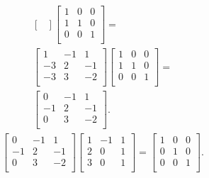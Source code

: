 \documentclass[12pt]{article}
\begin{document}
\begin{enumerate}
\begin{align*}
\begin{bmatrix}
      \end{bmatrix}
      \begin{bmatrix}
        1 &  0 & 0\\
        1 &  1 & 0\\
        0 &  0 & 1\\
      \end{bmatrix} =\\
      \begin{bmatrix}
         1 & -1 &  1\\
        -3 &  2 & -1\\
        -3 &  3 & -2\\
      \end{bmatrix}
      \begin{bmatrix}
        1 &  0 & 0\\
        1 &  1 & 0\\
        0 &  0 & 1\\
      \end{bmatrix} =\\
      \begin{bmatrix}
         0 & -1 &  1\\
        -1 &  2 & -1\\
         0 &  3 & -2\\
      \end{bmatrix}.
    \end{align*}
    \begin{align*}
      \begin{bmatrix}
         0 & -1 &  1\\
        -1 &  2 & -1\\
         0 &  3 & -2\\
      \end{bmatrix}
      \begin{bmatrix}
        1 & -1 & 1\\
        2 &  0 & 1\\
        3 &  0 & 1\\
      \end{bmatrix}
      =
      \begin{bmatrix}
        1 & 0 & 0\\
        0 & 1 & 0\\
        0 & 0 & 1\\
      \end{bmatrix}.
    \end{align*}


\end{enumerate}
\end{document}
